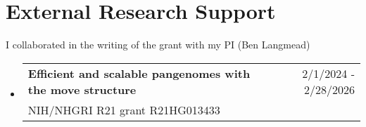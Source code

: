 \documentclass[A4,11pt]{article}
\makeatletter
\newcommand{\CVSubheading}[4]{
  \vspace{-2pt}\item
    \begin{tabular*}{0.97\textwidth}[t]{l@{\extracolsep{\fill}}r}
      \textbf{#1} & #2 \\
      \small#3 & \small #4 \\
    \end{tabular*}\vspace{-7pt}
}
\newcommand{\CVSubHeadingListStart}{\begin{itemize}[leftmargin=0.5cm, label={}]}
\newcommand{\CVSubHeadingListEnd}{\end{itemize}}
\makeatother
\begin{document}

  \section{External Research Support}
  I collaborated in the writing of the grant with my PI (Ben Langmead)\\
  \CVSubHeadingListStart
  \CVSubheading
  {Efficient and scalable pangenomes with the move structure} {2/1/2024 - 2/28/2026}
  {NIH/NHGRI R21 grant R21HG013433}{}
  \CVSubHeadingListEnd



\begin{comment}
\section{Community Involvement}
  \CVSubHeadingListStart
    \CVSubheading
      {Austin College Community Tutors}{Fall 2017 -- Fall 2018}
      {Free tutoring for local students in science and mathematics}{Sherman, TX}
    \CVSubheading
      {River Legacy Nature Center}{September 2015 -- August 2016}
      {Provided assistance for various youth science education programs}{Arlington, TX}
    \CVSubheading
      {Back on My Feet Run Club}{April 2014 -- August 2015}
      {Helping to reestablish homeless persons in the community}{Austin, TX}
  \CVSubHeadingListEnd
\end{comment}
\begin{comment}
This section is compressed from the various skills sections that Euro CV
recommends.
\end{comment}
\end{document}
